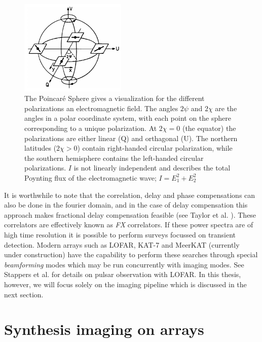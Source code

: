 \documentclass[a4paper,10pt]{report}
\begin{document}
\begin{figure}
 \begin{mdframed}
 \centering
 \includegraphics[width=0.45\textwidth]{images/poincare_sphere.png}
 \caption[The Poincar\'e Sphere]{The Poincar\'e Sphere gives a visualization for the different polarizations an electromagnetic field. The angles $2\psi$ and
 $2\chi$ are the angles in a polar coordinate system, with each point on the sphere corresponding to a unique polarization. At $2\chi=0$ (the equator) the polarizations 
 are either linear (Q) and orthagonal (U). The northern latitudes ($2\chi > 0$) contain right-handed circular polarization, while the southern hemisphere 
 contains the left-handed circular polarizations. $I$ is not linearly independent and describes the total Poynting flux of the electromagnetic wave; $I = E_1^2 + E_2^2$ \cite{wilson2009tools}}
  \label{fig_poincare}
 \end{mdframed}
\end{figure}

It is worthwhile to note that the correlation, delay and phase compensations can also be done in the fourier domain, and in the case of delay compensation this approach makes fractional delay compensation feasible (see Taylor et al. \cite{taylor1999synthesis}). These correlators are effectively 
known as \textit{FX} correlators. If these power spectra are of high time resolution it is possible to perform surveys focussed on transient detection. Modern arrays such as LOFAR, KAT-7 and MeerKAT (currently under construction) have the capability to perform these searches through
special \textit{beamforming} modes which may be run concurrently with imaging modes. See Stappers et al. \cite{stappers2011observing} for details on pulsar observation with LOFAR. In this thesis, however, we will focus solely on the imaging pipeline which is discussed in the next section.

\section{Synthesis imaging on arrays}
\end{document}
